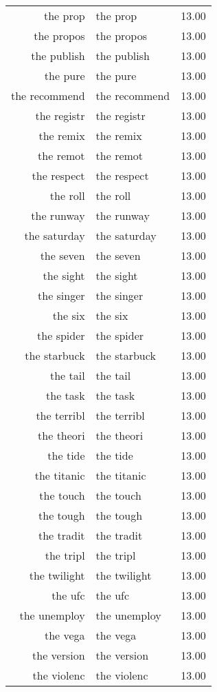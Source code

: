 \begin{table}[ht]
\begin{tabular}{rlr}
  the prop & the prop & 13.00 \\ 
  the propos & the propos & 13.00 \\ 
  the publish & the publish & 13.00 \\ 
  the pure & the pure & 13.00 \\ 
  the recommend & the recommend & 13.00 \\ 
  the registr & the registr & 13.00 \\ 
  the remix & the remix & 13.00 \\ 
  the remot & the remot & 13.00 \\ 
  the respect & the respect & 13.00 \\ 
  the roll & the roll & 13.00 \\ 
  the runway & the runway & 13.00 \\ 
  the saturday & the saturday & 13.00 \\ 
  the seven & the seven & 13.00 \\ 
  the sight & the sight & 13.00 \\ 
  the singer & the singer & 13.00 \\ 
  the six & the six & 13.00 \\ 
  the spider & the spider & 13.00 \\ 
  the starbuck & the starbuck & 13.00 \\ 
  the tail & the tail & 13.00 \\ 
  the task & the task & 13.00 \\ 
  the terribl & the terribl & 13.00 \\ 
  the theori & the theori & 13.00 \\ 
  the tide & the tide & 13.00 \\ 
  the titanic & the titanic & 13.00 \\ 
  the touch & the touch & 13.00 \\ 
  the tough & the tough & 13.00 \\ 
  the tradit & the tradit & 13.00 \\ 
  the tripl & the tripl & 13.00 \\ 
  the twilight & the twilight & 13.00 \\ 
  the ufc & the ufc & 13.00 \\ 
  the unemploy & the unemploy & 13.00 \\ 
  the vega & the vega & 13.00 \\ 
  the version & the version & 13.00 \\ 
  the violenc & the violenc & 13.00 \\ 

\end{tabular}
\end{table}
